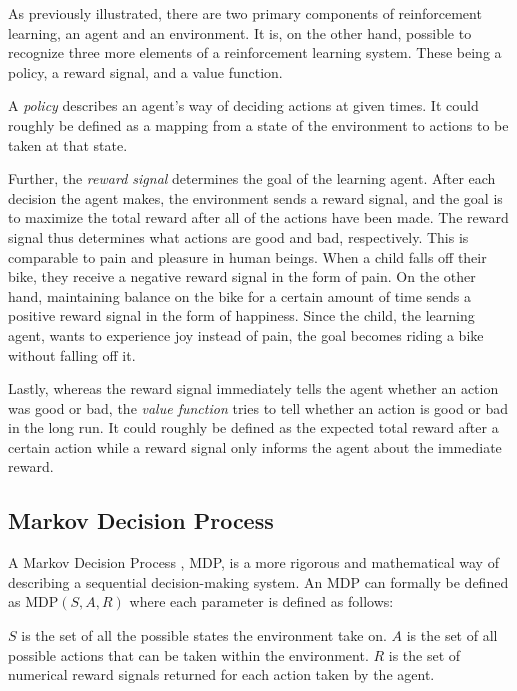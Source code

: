 \documentclass[titlepage]{article}
\begin{document}
\vskip 0.3cm

As previously illustrated, there are two primary components of reinforcement learning, an agent and an environment. It is, on the other hand, possible to recognize three more elements of a reinforcement learning system. These being a policy, a reward signal, and a value function. 

\vskip 0.3cm

\noindent
A \emph{policy} \cite{sutton} describes an agent's way of deciding actions at given times. It could roughly be defined as a mapping from a state of the environment to actions to be taken at that state. 
\vskip 0.3cm

\noindent
Further, the \emph{reward signal} \cite{sutton} determines the goal of the learning agent. After each decision the agent makes, the environment sends a reward signal, and the goal is to maximize the total reward after all of the actions have been made. The reward signal thus determines what actions are good and bad, respectively. This is comparable to pain and pleasure in human beings. When a child falls off their bike, they receive a negative reward signal in the form of pain. On the other hand, maintaining balance on the bike for a certain amount of time sends a positive reward signal in the form of happiness. Since the child, the learning agent, wants to experience joy instead of pain, the goal becomes riding a bike without falling off it. 

\vskip 0.3cm

\noindent
Lastly, whereas the reward signal immediately tells the agent whether an action was good or bad, the \emph{value function} \cite{sutton} tries to tell whether an action is good or bad in the long run. It could roughly be defined as the expected total reward after a certain action while a reward signal only informs the agent about the immediate reward. 

\subsection{Markov Decision Process}

\vskip 0.2cm

A Markov Decision Process \cite{sutton}, MDP, is a more rigorous and mathematical way of describing a sequential decision-making system. An MDP can formally be defined as MDP$(S, A, R)$ where each parameter is defined as follows:

\vskip 0.3cm

\begin{outline}
    \1 $S$ is the set of all the possible states the environment take on.
    \1 $A$ is the set of all possible actions that can be taken within the environment.
    \1 $R$ is the set of numerical reward signals returned for each action taken by the agent.
\end{outline}
\end{document}
